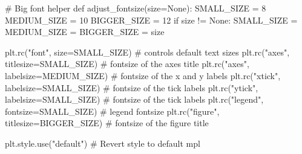\documentclass[
  letterpaper,
  DIV=11,
  numbers=noendperiod]{scrreprt}
\newenvironment{Shaded}{\begin{snugshade}}{\end{snugshade}}
\newcommand{\CommentTok}[1]{\textcolor[rgb]{0.37,0.37,0.37}{#1}}
\newcommand{\ControlFlowTok}[1]{\textcolor[rgb]{0.00,0.23,0.31}{#1}}
\newcommand{\DecValTok}[1]{\textcolor[rgb]{0.68,0.00,0.00}{#1}}
\newcommand{\KeywordTok}[1]{\textcolor[rgb]{0.00,0.23,0.31}{#1}}
\newcommand{\NormalTok}[1]{\textcolor[rgb]{0.00,0.23,0.31}{#1}}
\newcommand{\OperatorTok}[1]{\textcolor[rgb]{0.37,0.37,0.37}{#1}}
\newcommand{\StringTok}[1]{\textcolor[rgb]{0.13,0.47,0.30}{#1}}
\newcommand{\VariableTok}[1]{\textcolor[rgb]{0.07,0.07,0.07}{#1}}
\begin{document}
\begin{Shaded}
\begin{Highlighting}[]
\CommentTok{\# Big font helper}
\KeywordTok{def}\NormalTok{ adjust\_fontsize(size}\OperatorTok{=}\VariableTok{None}\NormalTok{):}
\NormalTok{    SMALL\_SIZE }\OperatorTok{=} \DecValTok{8}
\NormalTok{    MEDIUM\_SIZE }\OperatorTok{=} \DecValTok{10}
\NormalTok{    BIGGER\_SIZE }\OperatorTok{=} \DecValTok{12}
    \ControlFlowTok{if}\NormalTok{ size }\OperatorTok{!=} \VariableTok{None}\NormalTok{:}
\NormalTok{        SMALL\_SIZE }\OperatorTok{=}\NormalTok{ MEDIUM\_SIZE }\OperatorTok{=}\NormalTok{ BIGGER\_SIZE }\OperatorTok{=}\NormalTok{ size}

\NormalTok{    plt.rc(}\StringTok{"font"}\NormalTok{, size}\OperatorTok{=}\NormalTok{SMALL\_SIZE)  }\CommentTok{\# controls default text sizes}
\NormalTok{    plt.rc(}\StringTok{"axes"}\NormalTok{, titlesize}\OperatorTok{=}\NormalTok{SMALL\_SIZE)  }\CommentTok{\# fontsize of the axes title}
\NormalTok{    plt.rc(}\StringTok{"axes"}\NormalTok{, labelsize}\OperatorTok{=}\NormalTok{MEDIUM\_SIZE)  }\CommentTok{\# fontsize of the x and y labels}
\NormalTok{    plt.rc(}\StringTok{"xtick"}\NormalTok{, labelsize}\OperatorTok{=}\NormalTok{SMALL\_SIZE)  }\CommentTok{\# fontsize of the tick labels}
\NormalTok{    plt.rc(}\StringTok{"ytick"}\NormalTok{, labelsize}\OperatorTok{=}\NormalTok{SMALL\_SIZE)  }\CommentTok{\# fontsize of the tick labels}
\NormalTok{    plt.rc(}\StringTok{"legend"}\NormalTok{, fontsize}\OperatorTok{=}\NormalTok{SMALL\_SIZE)  }\CommentTok{\# legend fontsize}
\NormalTok{    plt.rc(}\StringTok{"figure"}\NormalTok{, titlesize}\OperatorTok{=}\NormalTok{BIGGER\_SIZE)  }\CommentTok{\# fontsize of the figure title}

\NormalTok{plt.style.use(}\StringTok{"default"}\NormalTok{)  }\CommentTok{\# Revert style to default mpl}
\end{Highlighting}
\end{Shaded}
\end{document}
